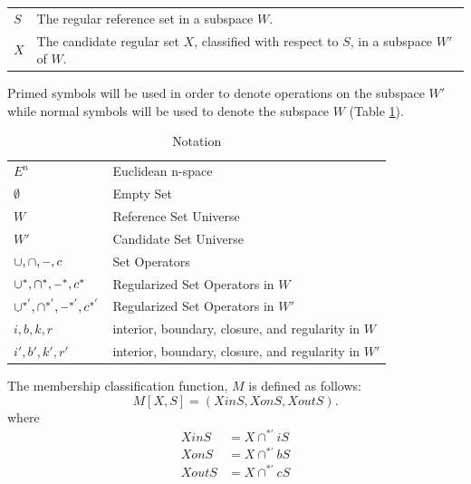 \documentclass[a4paper,11pt,oneside]{article}
\makeatletter
\newcommand{\minus}{\scalebox{0.9}[1.0]{$-$}} %
\newenvironment{conditions}
  {\par\vspace{\abovedisplayskip}\noindent\begin{tabular}{>{$}l<{$} @{${}={}$} l}}
  {\end{tabular}\par\vspace{\belowdisplayskip}}
\makeatother
\begin{document}
\begin{conditions}
	S     &  The regular reference set in a subspace $W$. \\
	X     &  The candidate regular set $X$, classified with respect to $S$, in a subspace $W'$ of $W$. \\
\end{conditions}

Primed symbols will be used	in order to denote operations on the subspace $W'$ while normal symbols will be used to denote the subspace $W$ (Table \ref{table:notations}).
 
\begin{table}
	\caption{Notation}
	\label{table:notations}
	\begin{tabularx}{\textwidth}{p{}X}
		\toprule
		$E^n$                                       & Euclidean n-space                                   \\
		$\emptyset$                                 & Empty Set                                           \\
		$W$                                         & Reference Set Universe                              \\
		$W'$                                        & Candidate Set Universe                              \\
		$\cup, \cap, \minus, c$                     & Set Operators                                       \\
		$\cup^*, \cap^*, \minus^*, c^*$             & Regularized Set Operators in $W$                    \\
		$\cup^{*'}, \cap^{*'}, \minus^{*'}, c^{*'}$ & Regularized Set Operators in $W'$                   \\
		$i, b, k, r$                                & interior, boundary, closure, and regularity in $W$  \\
		$i', b', k', r'$                            & interior, boundary, closure, and regularity in $W'$ \\
		\bottomrule
	\end{tabularx}
\end{table}

\begin{definition}
	The membership classification function, $M$ is defined as follows:
	\begin{equation}
		M[X, S] = (XinS, XonS, XoutS).
	\end{equation}
	where
	\begin{align*}
		XinS  & = X \cap^{*'} iS \\
		XonS  & = X \cap^{*'} bS \\
		XoutS & = X \cap^{*'} cS 
	\end{align*}
\end{definition}
\end{document}
